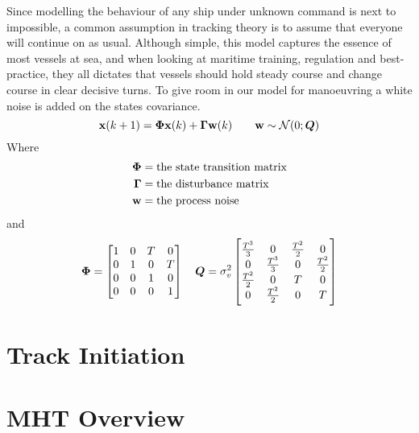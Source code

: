 Since modelling the behaviour of any ship under unknown command is next to impossible, a common assumption in tracking theory is to assume that everyone will continue on as usual. Although simple, this model captures the essence of most vessels at sea, and when looking at maritime training, regulation and best-practice, they all dictates that vessels should hold steady course and change course in clear decisive turns. To give room in our model for manoeuvring a white noise is added on the states covariance. 
\begin{equation}
\boldsymbol{\mathbf{x}}(k+1) = \bm{\Phi} \boldsymbol{\mathbf{x}}(k) + \bm{\Gamma} \boldsymbol{\mathbf{w}}(k) \qquad \boldsymbol{\mathbf{w}} \sim \mathcal{N}(0;\bm{Q})
\label{eq:motion_model}
\end{equation}
Where 
\begin{equation}
\begin{split}
\bm{\Phi} 	&= \text{the state transition matrix} \\
\bm{\Gamma}	&= \text{the disturbance matrix} \\
\boldsymbol{\mathbf{w}}		&= \text{the process noise}
\end{split}
\end{equation}
and 
\begin{equation*}
\bm{\Phi} =	\begin{bmatrix}
1 & 0 & T & 0 \\
0 & 1 & 0 & T \\
0 & 0 & 1 & 0 \\
0 & 0 & 0 & 1 \\
\end{bmatrix}
\quad
\bm{Q}	= \sigma_v^2 \begin{bmatrix}
\frac{T^3}{3} 	& 0 				& \frac{T^2}{2}	& 0 			\\
0 				& \frac{T^3}{3}  	& 0 			& \frac{T^2}{2}	\\
\frac{T^2}{2}	& 0					& T				& 0				\\
0				& \frac{T^2}{2}		& 0				& T				\\
\end{bmatrix}
\end{equation*}



\section{Track Initiation}

\section{MHT Overview}


